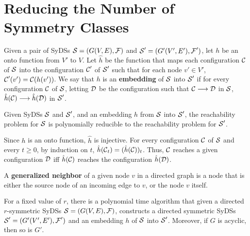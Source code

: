 \section{Reducing the Number of Symmetry Classes}
\label{sec:r_symmetric}

\begin{definition}\label{def:SyDS_homomorphisml}
Given a pair of SyDSs $\mbox{$\mathcal{S}$} = (G(V,E), \mbox{$\mathcal{F}$})$ and $\mbox{$\mathcal{S}$}' = (G'(V',E'), \mbox{$\mathcal{F}$}')$,
let $h$ be an onto function from $V'$ to $V$.
Let $\hat{h}$ be the function that maps each configuration $\mbox{$\mathcal{C}$}$ of $\mbox{$\mathcal{S}$}$
into the configuration $\mbox{$\mathcal{C}$}'$ of $\mbox{$\mathcal{S}$}'$ 
such that for each node $v' \in V'$, 
$\mbox{$\mathcal{C}$}'(v') = \mbox{$\mathcal{C}$}(h(v'))$.
We say that $h$ is an \textbf{embedding} of $\mbox{$\mathcal{S}$}$ into $\mbox{$\mathcal{S}$}'$
if for every configuration $\mbox{$\mathcal{C}$}$ of $\mbox{$\mathcal{S}$}$,
letting $\mbox{$\mathcal{D}$}$  be the configuration such that $\mbox{$\mathcal{C}$} \longrightarrow \mbox{$\mathcal{D}$}$ in $\mbox{$\mathcal{S}$}$,
$\hat{h}(\mbox{$\mathcal{C}$}) \longrightarrow \hat{h}(\mbox{$\mathcal{D}$})$ in $\mbox{$\mathcal{S}$}'$.
\end{definition}

\begin{lemma}\label{lem:embedding_reachability}
 Given SyDSs $\mbox{$\mathcal{S}$}$ and $\mbox{$\mathcal{S}$}'$, and an embedding $h$ from $\mbox{$\mathcal{S}$}$ into  $\mbox{$\mathcal{S}$}'$,
the reachability problem for $\mbox{$\mathcal{S}$}$ is polynomially reducible
to the reachability problem for $\mbox{$\mathcal{S}$}'$.
\end{lemma}

\noindent
Since $h$ is an onto function, $\hat{h}$  is injective.
For every configuration $\mbox{$\mathcal{C}$}$ of $\mbox{$\mathcal{S}$}$ and every $t \geq 0$,
by induction on $t$,
$\hat{h}(\mbox{$\mathcal{C}$}_t) = (\hat{h}(\mbox{$\mathcal{C}$}))_t $.
Thus, $\mbox{$\mathcal{C}$}$ reaches a given configuration $\mbox{$\mathcal{D}$}$
iff $\hat{h}(\mbox{$\mathcal{C}$})$ reaches the configuration $\hat{h}(\mbox{$\mathcal{D}$})$.
\QED

\begin{definition}\label{tdef:generalized_neighbor}
A {\bf generalized neighbor} of a given node $v$ in a directed graph is a node that
is either the source node of an incoming edge to $v$, or the node $v$  itself.
\end{definition}



\begin{theorem}\label{thm:r_symmetric_directed}
For a fixed value of $r$, there is a polynomial time algorithm
that given a directed $r$-symmetric SyDSs $\mbox{$\mathcal{S}$} = (G(V,E), \mbox{$\mathcal{F}$})$,  
constructs a directed symmetric SyDSs $\mbox{$\mathcal{S}$}' = (G'(V',E'), \mbox{$\mathcal{F}$}')$ and an embedding $h$ of $\mbox{$\mathcal{S}$}$ into $\mbox{$\mathcal{S}$}'$.
Moreover, if  $G$ is acyclic, then so is $G'$.
\end{theorem}

